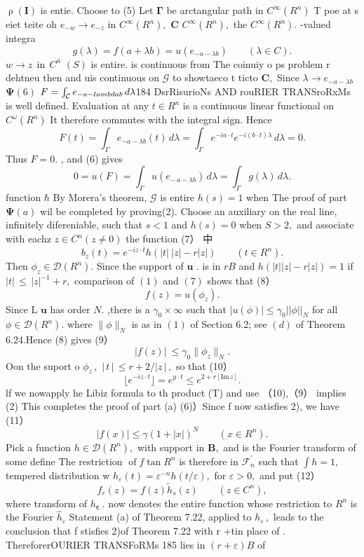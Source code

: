 $\operatorname{\rho}(\mathbf{I})$ is entie. Choose to (5) Let ${\boldsymbol{\Gamma}}$ be arctangular path in $C^{\infty}(R^{n})$ T poe at s eiet teite oh $e_{-w}\to e_{-z}$ in $C^{\infty}(R^{n}),$ ${\boldsymbol{C}}$ $C^{\infty}(R^{n}),$ the $C^{\infty}(R^{n}).$ -valued integra $$ g(\lambda)=f(a+\lambda b)=u(e_{-a-\lambda b})\qquad(\lambda\in C). $$ $w\to z\,\operatorname{in}\,C^{n}$ $\left(S\right)$ is entire. is continuous from The coinuiy o ps problem r dehtneu then and uis continuous on $\scriptstyle{\mathcal{G}}$ to showtaeco t ticto ${\boldsymbol{C}},$ Since $\lambda\to e_{-a-\lambda b}$ $\mathbf{\Psi}(6)$ $F=\int_{\cal C}e_{-a-lambda b}\,d\lambda$184 DsrRisurioNs AND rouRIER TRANSroRxMs is well defined. Evaluation at any $t\in R^{n}$ is a continuous linear functional on $C^{\omega}(R^{n})$ It therefore commutes with the integral sign. Hence $$ F(t)=\int_{\Gamma}e_{-a-\lambda b}(t)\,d\lambda=\int_{\Gamma}e^{-i a\cdot t}e^{-i(b\cdot t)\lambda}\,d\lambda=0. $$ Thus $F=0.$ , and (6) gives $$ 0=u(F)=\int_{\Gamma}u(e_{-\,a-\lambda b})\,d\lambda=\int_{\Gamma}g(\lambda)\,d\lambda. $$ function $\boldsymbol{\hbar}$ By Morera's theorem, $\textstyle{\mathcal{G}}$ is entire $h(s)=1$ when The proof of part $\mathbf{\Psi}(a)$ wil be completed by proving(2). Choose an auxiliary on the real line, infinitely difereniable, such that $s<1$ and $h(s)=0$ when $S>2,$ and associate with eachz $z\in C^{n}(z\neq0)$ the function (7） 中 $$ b_{z}(t)=e^{-i z\cdot{\bar{t}}}h(|t|\ |z|-r|z|)\qquad(t\in R^{n}). $$ Then $\phi_{z}\in{\mathcal{D}}(R^{n}).$ Since the support of $\boldsymbol{u}$ . is in $r B$ and $h(\left|t\right|\left|z\right|-r\left|z\right|)=1$ if $|t|\,\leq\,|z|^{-1}+r,$ comparison of $\operatorname{\mathcal{(1)}}$ and $(7)$ shows that (8） $$ f(z)=u(\phi_{z}). $$ Since L $\boldsymbol{u}$ has order $N.$ ,there is a $\gamma_{0}\times\infty$ such that $|u(\phi)|\leq\gamma_{0}||\phi||_{N}$ for all $\phi\in{\mathcal{D}}(R^{n}).$ where $\|\phi\|_{N}$ is as in $\operatorname{\mathcal{(1)}}$ of Section 6.2; see $(d)$ of Theorem 6.24.Hence (8) gives (9） $$ |f(z)|\ \leq\gamma_{0}\|\phi_{z}\|_{N}. $$ Oon the suport o $\phi_{z}\,,$ $|\,t\,|\,\leq r+2/|z\,|\,,$ so that (10） $$ \lfloor e^{-i z\cdot t}\rfloor=e^{y\cdot t}\leq e^{2+r\left[\mathrm{Im}\,z\right]}. $$ lf we nowapply he Libiz formula to th product (T) and use （10),（9） implies (2) This completes the proof of part (a) (6)）Since f now satisfies 2), we have (11） $$ |f(x)|\leq\gamma(1+|x|)^{N}\qquad(x\in R^{n}). $$ Pick a function $h\in{\mathcal{D}}(R^{n}),$ with support in ${\boldsymbol{B}},$ and is the Fourier transform of some define The restriction $\operatorname{of}f\tan R^{n}$ is therefore in ${\mathcal{F}}_{n}^{\prime}$ such that $\textstyle{\int}h=1,$ tempered distribution w $h_{\varepsilon}(t)=\varepsilon^{-n}h(t/\varepsilon),$ for $\varepsilon>0,$ and put (12） $$ f_{r}(z)=f(z)\tilde{h}_{s}(z)\qquad(z\in C^{n}), $$ where transform of $h_{\boldsymbol{\varepsilon}}\,.$ now denotes the entire function whose restriction to $R^{n}$ is the Fourier ${\hat{h}}_{\varepsilon}$ Statement (a) of Theorem 7.22, applied to $h_{\varepsilon}\,,$ leads to the conclusion that f stisfies 2)of Theorem 7.22 with r +tin place of . ThereforerOURIER TRANSFoRMs 185 lies in $(r+\varepsilon)B$ of 